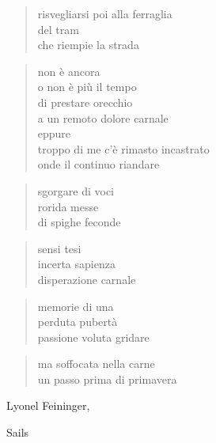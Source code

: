 	\begin{verse}
		risvegliarsi poi alla ferraglia\\
		del tram\\
		che riempie la strada
	\end{verse}

\clearpage


	\begin{verse}
		non è ancora\\
		o non è più il tempo\\
		di prestare orecchio\\
		a un remoto dolore carnale\\
		eppure\\
		troppo di me c'è rimasto incastrato\\
		onde il continuo riandare
	\end{verse}

\clearpage


	\begin{verse}
		sgorgare di voci\\
		rorida messe\\
		di spighe feconde
	\end{verse}

	\begin{verse}
		sensi tesi\\
		incerta sapienza\\
		disperazione carnale
	\end{verse}

	\begin{verse}
		memorie di una\\
		perduta pubertà\\
		passione voluta gridare
	\end{verse}

	\begin{verse}
		ma soffocata nella carne\\
		un passo prima di primavera
	\end{verse}

\clearpage


\begin{artItem}
	Lyonel Feininger, \begin{otherlanguage}{english}%
		Sails%
	\end{otherlanguage}
\end{artItem}

